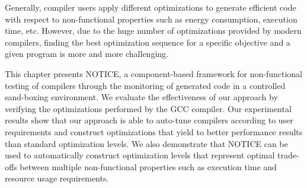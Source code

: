 
	
	Generally, compiler users apply different optimizations to generate efficient code with respect to non-functional properties such as energy consumption, execution time, etc. However, due to the huge number of optimizations provided by modern compilers, finding the best optimization sequence for a specific objective and a given program is more and more challenging. 
	
	This chapter presents NOTICE, a component-based framework for non-functional testing of compilers through the monitoring of generated code in a controlled sand-boxing environment.
	We evaluate the effectiveness of our approach by verifying the optimizations performed by the GCC compiler.
	Our experimental results show that our approach is able to auto-tune compilers according to user requirements and construct optimizations that yield to better performance results than standard optimization levels.
	We also demonstrate that NOTICE can be used to automatically construct optimization levels that represent optimal trade-offs between multiple non-functional properties such as execution time and resource usage requirements.
	
	
	

